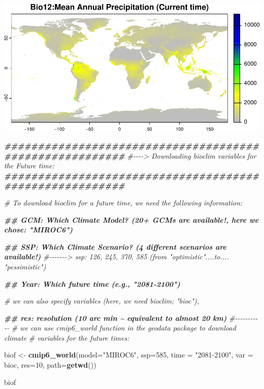 \documentclass[
]{article}
\newenvironment{Shaded}{\begin{snugshade}}{\end{snugshade}}
\newcommand{\AttributeTok}[1]{\textcolor[rgb]{0.13,0.29,0.53}{#1}}
\newcommand{\CommentTok}[1]{\textcolor[rgb]{0.56,0.35,0.01}{\textit{#1}}}
\newcommand{\DecValTok}[1]{\textcolor[rgb]{0.00,0.00,0.81}{#1}}
\newcommand{\DocumentationTok}[1]{\textcolor[rgb]{0.56,0.35,0.01}{\textbf{\textit{#1}}}}
\newcommand{\FunctionTok}[1]{\textcolor[rgb]{0.13,0.29,0.53}{\textbf{#1}}}
\newcommand{\NormalTok}[1]{#1}
\newcommand{\OtherTok}[1]{\textcolor[rgb]{0.56,0.35,0.01}{#1}}
\newcommand{\StringTok}[1]{\textcolor[rgb]{0.31,0.60,0.02}{#1}}
\begin{document}
\includegraphics{sdm_R_files/figure-latex/unnamed-chunk-2-2.pdf}

\begin{Shaded}
\begin{Highlighting}[]
\DocumentationTok{\#\#\#\#\#\#\#\#\#\#\#\#\#\#\#\#\#\#\#\#\#\#\#\#\#\#\#\#\#\#\#\#\#\#\#\#\#\#\#\#\#\#\#\#\#\#\#\#\#\#\#\#\#\#\#\#}
\CommentTok{\#{-}{-}{-}{-}\textgreater{} Downloading bioclim variables for the Future time:}
\DocumentationTok{\#\#\#\#\#\#\#\#\#\#\#\#\#\#\#\#\#\#\#\#\#\#\#\#\#\#\#\#\#\#\#\#\#\#\#\#\#\#\#\#\#\#\#\#\#\#\#\#\#\#\#\#\#\#\#\#}

\CommentTok{\# To download bioclim for a future time, we need the following information:}

\DocumentationTok{\#\# GCM: Which Climate Model? (20+ GCMs are available!, here we chose: "MIROC6")}

\DocumentationTok{\#\# SSP: Which Climate Scenario? (4 different scenarios are available!)}
\CommentTok{\#{-}{-}{-}{-}{-}{-}{-}\textgreater{} ssp: 126, 245, 370, 585 (from "optimistic"....to.... "pessimistic")}

\DocumentationTok{\#\# Year: Which future time (e.g., "2081{-}2100")}

\CommentTok{\# we can also specify variables (here, we need bioclim; "bioc"), }

\DocumentationTok{\#\# res: resolution (10 arc min \textasciitilde{} equivalent to almost 20 km)}
\CommentTok{\#{-}{-}{-}{-}{-}{-}{-}{-}{-}{-}{-}}
\CommentTok{\# we can use cmip6\_world function in the geodata package to download climate }
\CommentTok{\# variables for the future times:}

\NormalTok{biof }\OtherTok{\textless{}{-}} \FunctionTok{cmip6\_world}\NormalTok{(}\AttributeTok{model=}\StringTok{"MIROC6"}\NormalTok{, }\AttributeTok{ssp=}\StringTok{\textquotesingle{}585\textquotesingle{}}\NormalTok{,}
                    \AttributeTok{time =} \StringTok{"2081{-}2100"}\NormalTok{, }\AttributeTok{var =} \StringTok{\textquotesingle{}bioc\textquotesingle{}}\NormalTok{, }\AttributeTok{res=}\DecValTok{10}\NormalTok{, }\AttributeTok{path=}\FunctionTok{getwd}\NormalTok{())}

\NormalTok{biof }
\end{Highlighting}
\end{Shaded}
\end{document}
